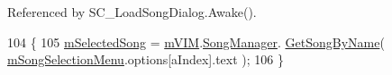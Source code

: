Referenced by S\+C\+\_\+\+Load\+Song\+Dialog.\+Awake().


\begin{DoxyCode}
104     \{
105         \hyperlink{group___s_c___l_s_d_priv_var_ga007db4c9493497f21fb518ab676226a4}{mSelectedSong} = \hyperlink{group___s_c___l_s_d_priv_var_ga6ffbaa999c431dd52e57c242b1b33b49}{mVIM}.\hyperlink{group___v_i_m_pub_ga33dae94932c10c66db76a0eebec76b01}{SongManager}.
      \hyperlink{group___s_m_pub_func_gafe818c55bd858c52c95a2fa7a566006a}{GetSongByName}( \hyperlink{group___s_c___l_s_d_priv_var_ga93543d4b5bf0c2127cb5489112cc29be}{mSongSelectionMenu}.options[aIndex].text );
106     \}
\end{DoxyCode}
